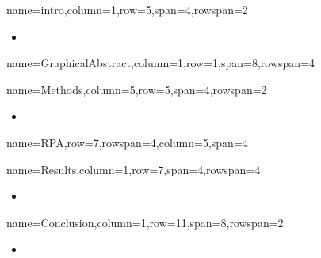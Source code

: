 \documentclass[
	accentcolor=3c,
	boxstyle=colored, %
	title=small
	]{tudasciposter}
\begin{document}
\begin{tcbposter}[
	poster={
		columns=8,
		rows=12,
		spacing=1cm,
	},]

\begin{posterboxenv}[title=1. Introduction]{name=intro,column=1,row=5,span=4,rowspan=2}
	\begin{itemize}
		\item 
	\end{itemize}
\end{posterboxenv}

\begin{posterboxenv}{name=GraphicalAbstract,column=1,row=1,span=8,rowspan=4}
\end{posterboxenv}

\begin{posterboxenv}[title=2. Methods]{name=Methods,column=5,row=5,span=4,rowspan=2}
	\begin{itemize}
		\item 
	\end{itemize}

\end{posterboxenv}

\begin{posterboxenv}{name=RPA,row=7,rowspan=4,column=5,span=4}
\end{posterboxenv}
\begin{posterboxenv}[title=3. Results]{name=Results,column=1,row=7,span=4,rowspan=4}
	\begin{itemize}
		\item 
	\end{itemize}
\end{posterboxenv}

\begin{posterboxenv}[title=4. Conclusion]{name=Conclusion,column=1,row=11,span=8,rowspan=2}
\begin{multicols}{2}		
	\begin{itemize}
		\item 
	\end{itemize}
\end{multicols}

\end{posterboxenv}

\end{tcbposter}
\end{document}
